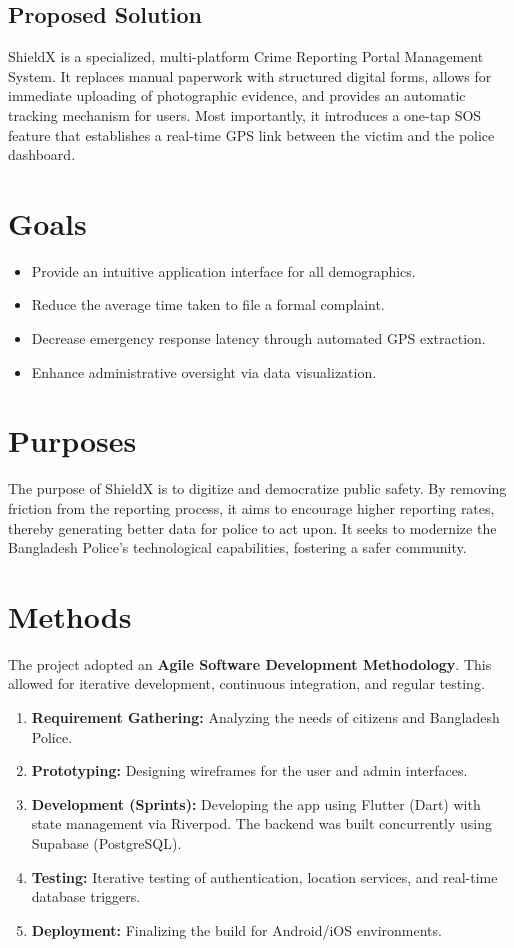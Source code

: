 \documentclass[12pt, a4paper, twoside]{report}
\begin{document}
\subsection{Proposed Solution}
ShieldX is a specialized, multi-platform Crime Reporting Portal Management System. It replaces manual paperwork with structured digital forms, allows for immediate uploading of photographic evidence, and provides an automatic tracking mechanism for users. Most importantly, it introduces a one-tap SOS feature that establishes a real-time GPS link between the victim and the police dashboard.

\section{Goals}
\begin{itemize}
    \item Provide an intuitive application interface for all demographics.
    \item Reduce the average time taken to file a formal complaint.
    \item Decrease emergency response latency through automated GPS extraction.
    \item Enhance administrative oversight via data visualization.
\end{itemize}

\section{Purposes}
The purpose of ShieldX is to digitize and democratize public safety. By removing friction from the reporting process, it aims to encourage higher reporting rates, thereby generating better data for police to act upon. It seeks to modernize the Bangladesh Police's technological capabilities, fostering a safer community.

\section{Methods}
The project adopted an \textbf{Agile Software Development Methodology}. This allowed for iterative development, continuous integration, and regular testing.
\begin{enumerate}
    \item \textbf{Requirement Gathering:} Analyzing the needs of citizens and Bangladesh Police.
    \item \textbf{Prototyping:} Designing wireframes for the user and admin interfaces.
    \item \textbf{Development (Sprints):} Developing the app using Flutter (Dart) with state management via Riverpod. The backend was built concurrently using Supabase (PostgreSQL).
    \item \textbf{Testing:} Iterative testing of authentication, location services, and real-time database triggers.
    \item \textbf{Deployment:} Finalizing the build for Android/iOS environments.
\end{enumerate}
\end{document}
